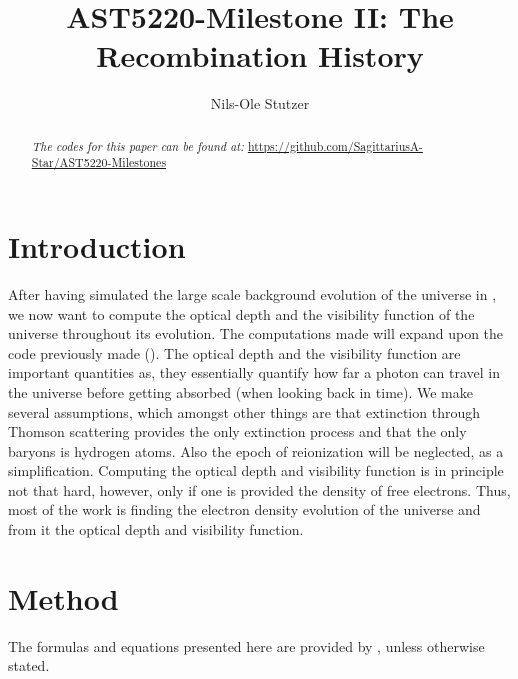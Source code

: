 \documentclass[twocolumn]{aastex62}
\begin{document}
\title{\Large AST5220-Milestone II: The Recombination History}

\author{Nils-Ole Stutzer}

\begin{abstract}
    
    \textit{The codes for this paper can be found at:} \newline \url{https://github.com/SagittariusA-Star/AST5220-Milestones}
\end{abstract}

\section{Introduction} \label{sec:Intro}
After having simulated the large scale background evolution of the universe in \cite{stutzer:2020}, we now want to compute the optical depth and the visibility function of the universe throughout its evolution. The computations made will expand upon the code previously made (\cite{stutzer:2020}). The optical depth and the visibility function are important quantities as, they essentially quantify how far a photon can travel in the universe before getting absorbed (when looking back in time). We make several assumptions, which amongst other things are that extinction through Thomson scattering provides the only extinction process and that the only baryons is hydrogen atoms. Also the epoch of reionization will be neglected, as a simplification. Computing the optical depth and visibility function is in principle not that hard, however, only if one is provided the density of free electrons. Thus, most of the work is finding the electron density evolution of the universe and from it the optical depth and visibility function. 

\section{Method} \label{sec:Method}
The formulas and equations presented here are provided by \cite{winther:2020}, unless otherwise stated.
\end{document}
